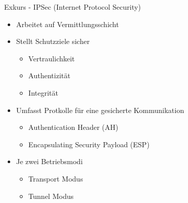 \documentclass{beamer}
\begin{document}
\begin{frame}{Exkurs - IPSec (Internet Protocol Security)}{\secname}
  \begin{itemize}
    \item Arbeitet auf Vermittlungsschicht
    \item Stellt Schutzziele sicher
    \begin{itemize}
      \item Vertraulichkeit
      \item Authentizität
      \item Integrität
    \end{itemize}
    \item Umfasst Protkolle für eine gesicherte Kommunikation
    \begin{itemize}
      \item Authentication Header (AH)
      \item Encapsulating Security Payload (ESP)
    \end{itemize}
    \item Je zwei Betriebsmodi
    \begin{itemize}
      \item Transport Modus
      \item Tunnel Modus
    \end{itemize}
  \end{itemize}
\end{frame}
\end{document}
